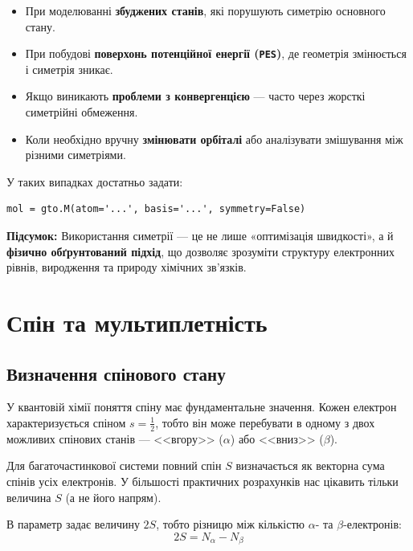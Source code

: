 \begin{itemize}
	\item При моделюванні \textbf{збуджених станів}, які порушують симетрію основного стану.
	\item При побудові \textbf{поверхонь потенційної енергії (\texttt{PES})}, де геометрія змінюється і симетрія зникає.
	\item Якщо виникають \textbf{проблеми з конвергенцією} --- часто через жорсткі симетрійні обмеження.
	\item Коли необхідно вручну \textbf{змінювати орбіталі} або аналізувати змішування між різними симетріями.
\end{itemize}

У таких випадках достатньо задати:
\begin{verbatim}
mol = gto.M(atom='...', basis='...', symmetry=False)
\end{verbatim}

\textbf{Підсумок:}
Використання симетрії --- це не лише «оптимізація швидкості», а й \textbf{фізично обґрунтований підхід},
що дозволяє зрозуміти структуру електронних рівнів, виродження та природу хімічних зв’язків.

\section{Спін та мультиплетність}

\subsection{Визначення спінового стану}

У квантовій хімії поняття спіну має фундаментальне значення.
Кожен електрон характеризується спіном $s = \frac{1}{2}$, тобто він може перебувати в одному з двох можливих спінових станів --- <<вгору>> ($\alpha$) або <<вниз>> ($\beta$).

Для багаточастинкової системи повний спін $S$ визначається як векторна сума спінів усіх електронів. У більшості практичних розрахунків нас цікавить тільки величина $S$ (а не його напрям).

В \PySCF{} параметр  задає величину $2S$, тобто різницю між кількістю $\alpha$- та $\beta$-електронів:
\begin{equation}
	2S = N_\alpha - N_\beta
\end{equation}

